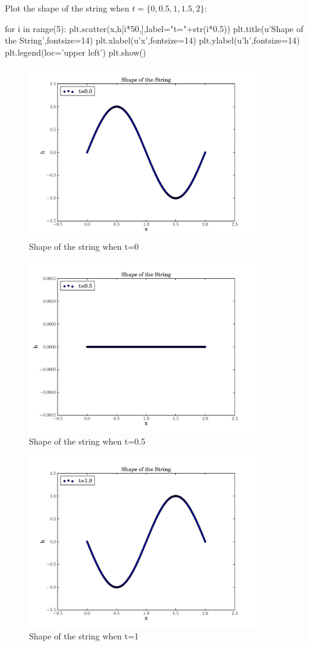 \documentclass[11pt]{article}
\begin{document}
Plot the shape of the string when $t=\{0, 0.5, 1, 1.5, 2\}$:
\begin{python}
	for i in range(5):
	plt.scatter(x,h[i*50,],label="t="+str(i*0.5))
	plt.title(u'Shape of the String',fontsize=14)
	plt.xlabel(u'x',fontsize=14)
	plt.ylabel(u'h',fontsize=14)
	plt.legend(loc='upper left')
	plt.show()
\end{python}

\begin{figure}[htb]
	\centering
	\includegraphics[width=10cm]{t=0.pdf}       
	\caption{Shape of the string when t=0}
\end{figure}

\begin{figure}[htb]
	\centering
	\includegraphics[width=10cm]{t=0_5.pdf}       
	\caption{Shape of the string when t=0.5}
\end{figure}

\begin{figure}[htb]
	\centering
	\includegraphics[width=10cm]{t=1.pdf}       
	\caption{Shape of the string when t=1}
\end{figure}
\end{document}
